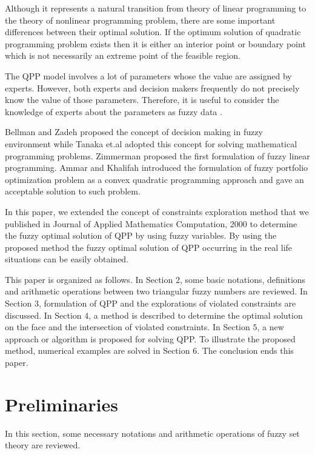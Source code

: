 \documentclass{iaesarticle3}
\begin{document}
Although it represents a natural transition from theory of linear programming to the theory of nonlinear programming problem, there are some important differences between their optimal solution. If the optimum solution of quadratic programming problem exists then it is either an interior point or boundary point which is not necessarily an extreme point of the feasible region.

The QPP model involves a lot of parameters whose the value are assigned by experts. However, both experts and decision makers frequently do not precisely know the value of those parameters. Therefore, it is useful to consider the knowledge of experts about the parameters as fuzzy data \cite{zad}.

Bellman and Zadeh \cite{bel} proposed the concept of decision making in fuzzy environment while Tanaka et.al \cite{Tan} adopted this concept for solving mathematical programming problems. Zimmerman \cite{zim} proposed the first formulation of fuzzy linear programming. Ammar and Khalifah \cite{amm} introduced the formulation of fuzzy portfolio optimization problem as a convex quadratic programming approach and gave an acceptable solution to such problem.

In this paper, we extended the concept of constraints exploration method that we published in Journal of Applied Mathematics Computation, 2000 to determine the fuzzy optimal solution of QPP by using fuzzy variables. By using the proposed method the fuzzy optimal solution of QPP occurring in the real life situations can be easily obtained.

This paper is organized as follows. In Section $2$, some basic notations, definitions and arithmetic operations between two triangular fuzzy numbers are reviewed. In Section $3$, formulation of QPP and the explorations of violated constraints are discussed. In Section $4$, a method is described to determine the optimal solution on the face and the intersection of violated constraints. In Section $5$, a new approach or algorithm is proposed for solving QPP. To illustrate the proposed method, numerical examples are solved in Section $6$. The conclusion ends this paper.

\section{Preliminaries}
\label{}
In this section, some necessary notations and arithmetic operations of fuzzy set theory are reviewed.
\end{document}
